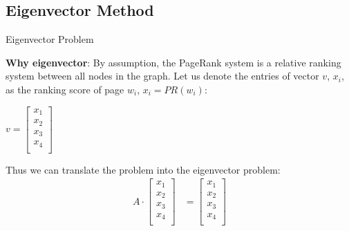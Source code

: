 \documentclass{beamer}
\begin{document}
\subsection{Eigenvector Method}
\begin{frame}[t]{Eigenvector Problem}
\begin{outline}
    \1 \textbf{Why eigenvector}: By assumption, the PageRank system is a relative ranking system between all nodes in the graph. 
    \1 Let us denote the entries of vector $v$, $x_i$, as the ranking score of page $w_i$, $x_i = PR(w_i)$:

    \begin{center}
        $v = \begin{bmatrix}
            x_1\\
            x_2\\
            x_3\\
            x_4\\
        \end{bmatrix}$
    \end{center}
    \1 Thus we can translate the problem into the eigenvector problem:
    \begin{align*}
        A\cdot \begin{bmatrix}
            x_1\\
            x_2\\
            x_3\\
            x_4\\
        \end{bmatrix} &= \begin{bmatrix}
            x_1\\
            x_2\\
            x_3\\
            x_4\\
        \end{bmatrix}
    \end{align*}
\end{outline}
\end{frame}



\end{document}

